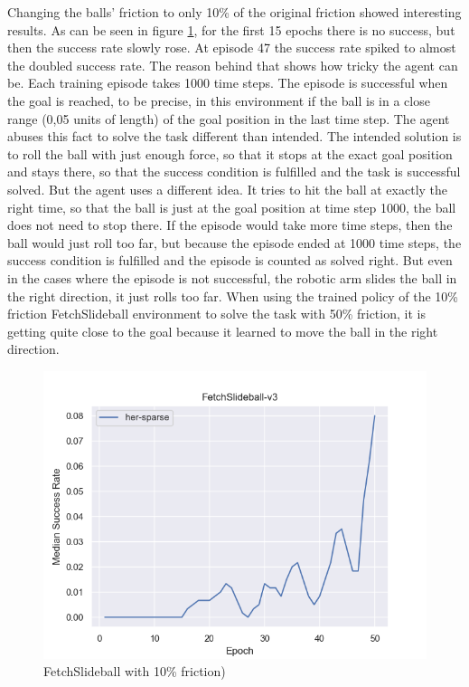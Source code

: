 Changing the balls' friction to only 10\% of the original friction showed interesting results. As can be seen in figure \ref{slideball4}, for the first 15 epochs there is no success, but then the success rate slowly rose. At episode 47 the success rate spiked to almost the doubled success rate. The reason behind that shows how tricky the agent can be. Each training episode takes 1000 time steps. The episode is successful when the goal is reached, to be precise, in this environment if the ball is in a close range (0,05 units of length) of the goal position in the last time step.
The agent abuses this fact to solve the task different than intended. The intended solution is to roll the ball with just enough force, so that it stops at the exact goal position and stays there, so that the success condition is fulfilled and the task is successful solved. But the agent uses a different idea. It tries to hit the ball at exactly the right time, so that the ball is just at the goal position at time step 1000, the ball does not need to stop there. If the episode would take more time steps, then the ball would just roll too far, but because the episode ended at 1000 time steps, the success condition is fulfilled and the episode is counted as solved right.
But even in the cases where the episode is not successful, the robotic arm slides the ball in the right direction, it just rolls too far. When using the trained policy of the 10\% friction FetchSlideball environment to solve the task with 50\% friction, it is getting quite close to the goal because it learned to move the ball in the right direction.


\begin{figure} [h]
	
	\centering
	\includegraphics[width=1\textwidth]{figures/fig_FetchSlideball-v3.png}
	\caption{FetchSlideball with 10\% friction)}
	\label{slideball4}
\end{figure}

